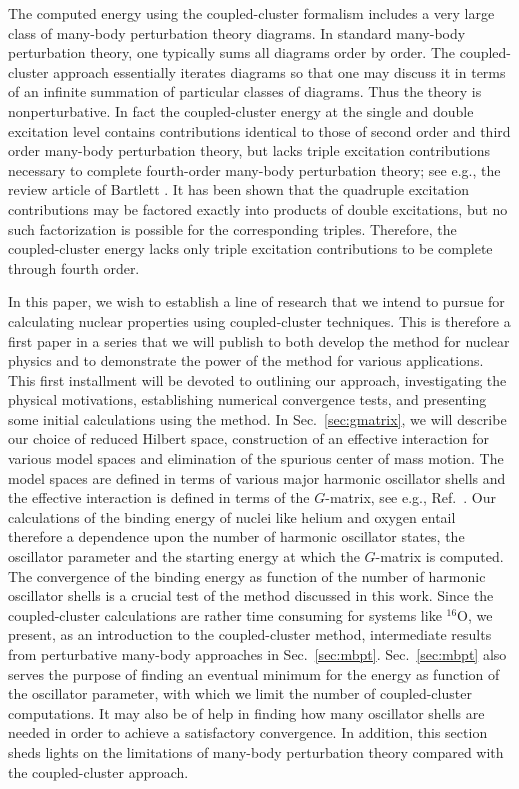 The computed energy using the coupled-cluster formalism includes 
a very large class of many-body perturbation theory diagrams.
In standard many-body perturbation theory, one typically sums 
all diagrams order by order. The coupled-cluster approach essentially
iterates diagrams so that one may discuss it in terms of an infinite 
summation of particular classes of diagrams.  Thus the theory is
nonperturbative. In fact the 
coupled-cluster energy at the single and double excitation level 
contains contributions identical to 
those of second order and third order many-body perturbation theory, but
lacks triple excitation contributions necessary to complete fourth-order
many-body perturbation theory; see e.g., the review article of 
Bartlett \cite{bartlett81}. It has been shown that the quadruple
excitation contributions may be factored exactly
into products of double excitations, but no such factorization is 
possible for the corresponding triples. Therefore, the coupled-cluster energy 
lacks only triple excitation contributions to be complete through 
fourth order.  

In this paper, we wish to establish a line of research that we
intend to pursue for calculating nuclear properties using coupled-cluster 
techniques. This is therefore a first paper in a series that 
we will publish to both develop the method for nuclear physics and to 
demonstrate the power of the method for various applications. This 
first installment will be devoted to outlining our approach, investigating
the physical motivations, establishing numerical convergence tests, and 
presenting some initial calculations using the method. 
In Sec.~\ref{sec:gmatrix},
we will describe our choice of reduced Hilbert space, 
construction of an effective interaction for various model spaces 
and elimination of the spurious center of mass motion. The model spaces
are defined in terms of various major harmonic oscillator shells and the 
effective interaction is defined in terms of the $G$-matrix,
see e.g., Ref.~\cite{hko95}. 
Our calculations of the binding energy of nuclei like helium and oxygen
entail therefore a dependence upon the number of harmonic oscillator states,
the oscillator parameter 
and the starting energy at which the $G$-matrix is computed. 
The convergence of the binding energy as function of the number of harmonic
oscillator shells  is a crucial test of the method discussed in this work. 
Since the coupled-cluster calculations are rather time consuming for systems
like $^{16}$O, we present, as an introduction to the coupled-cluster method, 
intermediate results from 
perturbative many-body approaches in Sec.~\ref{sec:mbpt}. 
Sec.~\ref{sec:mbpt} also
serves the purpose of finding an eventual minimum for the energy 
as function of the oscillator parameter, with which we limit the 
number of coupled-cluster computations. It may also be of help  
in finding  how many oscillator shells
are needed in order to achieve a satisfactory convergence. In addition, 
this section sheds lights on the limitations of many-body perturbation theory compared 
with the coupled-cluster approach.

